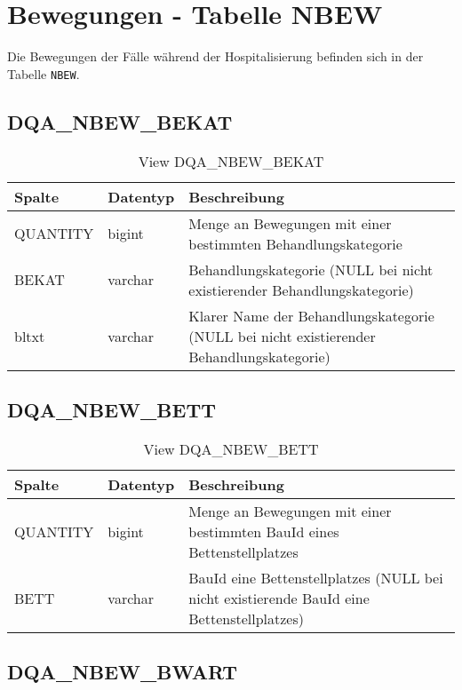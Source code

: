 \chapter{Bewegungen - Tabelle NBEW}
  Die Bewegungen der Fälle während der Hospitalisierung befinden sich in der Tabelle \texttt{NBEW}.

  \section{DQA\_NBEW\_BEKAT}

  \begin{table}[ht]
    \centering
    \caption{View DQA\_NBEW\_BEKAT}
    \label{tab:dqanbewbekat}
    \begin{tabular}{||l|l|p{10cm}||}
      \hline
      Spalte & Datentyp & Beschreibung \\ [0.5ex] \hline \hline
QUANTITY & bigint & Menge an Bewegungen mit einer bestimmten Behandlungskategorie \\ \hline
BEKAT & varchar & Behandlungskategorie (NULL bei nicht existierender Behandlungskategorie)\\ \hline
bltxt & varchar & Klarer Name der Behandlungskategorie (NULL bei nicht existierender Behandlungskategorie)\\ \hline
    \end{tabular}
  \end{table}
\clearpage
  \section{DQA\_NBEW\_BETT}

  \begin{table}[ht]
    \centering
    \caption{View DQA\_NBEW\_BETT}
    \label{tab:dqanbewbett}
    \begin{tabular}{||l|l|p{10cm}||}
      \hline
      Spalte & Datentyp & Beschreibung \\ [0.5ex] \hline \hline
QUANTITY & bigint & Menge an Bewegungen mit einer bestimmten BauId eines Bettenstellplatzes \\ \hline
BETT & varchar & BauId eine Bettenstellplatzes (NULL bei nicht existierende BauId eine Bettenstellplatzes)\\ \hline
    \end{tabular}
  \end{table}

  \section{DQA\_NBEW\_BWART}

